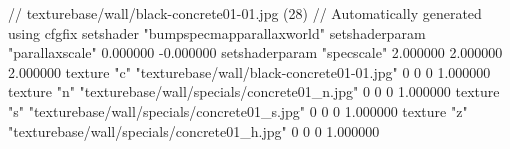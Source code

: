 // texturebase/wall/black-concrete01-01.jpg (28)
// Automatically generated using cfgfix
setshader "bumpspecmapparallaxworld"
setshaderparam "parallaxscale" 0.000000 -0.000000
setshaderparam "specscale" 2.000000 2.000000 2.000000
texture "c" "texturebase/wall/black-concrete01-01.jpg" 0 0 0 1.000000
texture "n" "texturebase/wall/specials/concrete01_n.jpg" 0 0 0 1.000000
texture "s" "texturebase/wall/specials/concrete01_s.jpg" 0 0 0 1.000000
texture "z" "texturebase/wall/specials/concrete01_h.jpg" 0 0 0 1.000000
